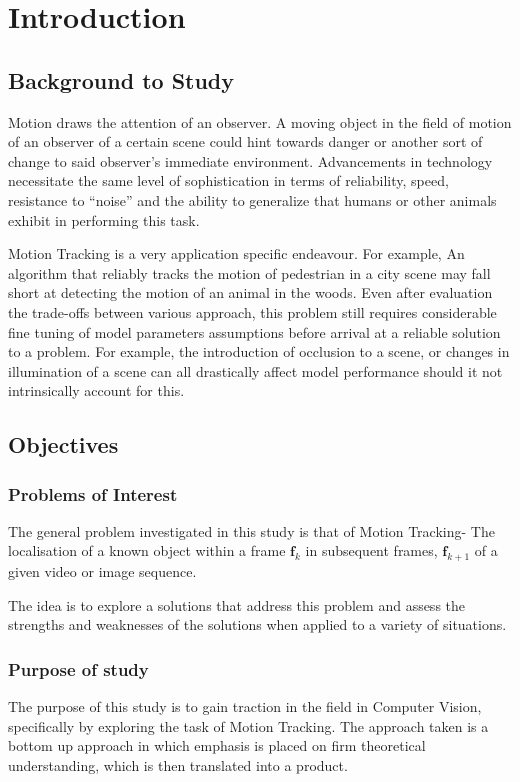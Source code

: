 \chapter{Introduction}

\section{Background to Study}
Motion draws the attention of an observer. A moving object in the field of
motion of an observer of a certain scene could hint towards danger or another
sort of change to said observer's immediate environment. Advancements in
technology necessitate the same level of sophistication in terms of
reliability, speed, resistance to ``noise'' and the ability to generalize that
humans or other animals exhibit in performing this task.

Motion Tracking is a very application specific endeavour. For example, An
algorithm that reliably tracks the motion of pedestrian in a city scene may fall
short at detecting the motion of an animal in the woods. Even after evaluation
the trade-offs between various approach, this problem still requires
considerable fine tuning of model parameters assumptions before arrival at a
reliable solution to a problem.  For example, the introduction of occlusion to a
scene, or changes in illumination of a scene can all drastically affect model
performance should it not intrinsically account for this.

\section{Objectives}\label{introduction_objectives}

\subsection{Problems of Interest}
The general problem investigated in this study is that of Motion Tracking- The
localisation of a known object within a frame $\mathbf{f}_k$ in subsequent
frames, $\mathbf{f}_{k+1}$ of a given video or image sequence.  

The idea is to explore a solutions that address this problem and assess the
strengths and weaknesses of the solutions when applied to a variety of
situations.

\subsection{Purpose of study}
The purpose of this study is to gain traction in the field in Computer Vision,
specifically by exploring the task of Motion Tracking. The approach taken is a
bottom up approach in which emphasis is placed on firm theoretical
understanding, which is then translated into a product.

